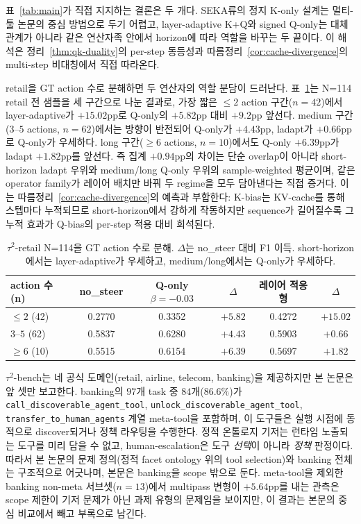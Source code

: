 표~\ref{tab:main}가 직접 지지하는 결론은 두 개다. SEKA류의 정지 K-only 설계는 멀티-툴 논문의 중심 방법으로 두기 어렵고, layer-adaptive K+Q와 signed Q-only는 대체 관계가 아니라 같은 연산자족 안에서 horizon에 따라 역할을 바꾸는 두 끝이다. 이 해석은 정리~\ref{thm:qk-duality}의 per-step 동등성과 따름정리~\ref{cor:cache-divergence}의 multi-step 비대칭에서 직접 따라온다.

retail을 GT action 수로 분해하면 두 연산자의 역할 분담이 드러난다. 표~\ref{tab:retail-action-count}는 N=114 retail 전 샘플을 세 구간으로 나눈 결과로, 가장 짧은 $\le 2$ action 구간($n=42$)에서 layer-adaptive가 $+15.02$pp로 Q-only의 $+5.82$pp 대비 $+9.2$pp 앞선다. medium 구간($3$--$5$ actions, $n=62$)에서는 방향이 반전되어 Q-only가 $+4.43$pp, ladapt가 $+0.66$pp로 Q-only가 우세하다. long 구간($\ge 6$ actions, $n=10$)에서도 Q-only $+6.39$pp가 ladapt $+1.82$pp를 앞선다. 즉 집계 $+0.94$pp의 차이는 단순 overlap이 아니라 short-horizon ladapt 우위와 medium/long Q-only 우위의 sample-weighted 평균이며, 같은 operator family가 레이어 배치만 바꿔 두 regime을 모두 담아낸다는 직접 증거다. 이는 따름정리~\ref{cor:cache-divergence}의 예측과 부합한다: K-bias는 KV-cache를 통해 스텝마다 누적되므로 short-horizon에서 강하게 작동하지만 sequence가 길어질수록 그 누적 효과가 Q-bias의 per-step 적용 대비 희석된다.

\begin{table}[t]
\centering
\caption{$\tau^2$-retail N=114을 GT action 수로 분해. $\Delta$는 no\_steer 대비 F1 이득. short-horizon에서는 layer-adaptive가 우세하고, medium/long에서는 Q-only가 우세하다.}
\label{tab:retail-action-count}
\small
\begin{tabularx}{\linewidth}{@{}lccccc@{}}
\toprule
action 수 (n) & no\_steer & Q-only $\beta{=}{-}0.03$ & $\Delta$ & 레이어 적응형 & $\Delta$ \\
\midrule
$\le 2$ (42) & 0.2770 & 0.3352 & $+5.82$ & 0.4272 & $+15.02$ \\
$3$--$5$ (62) & 0.5837 & 0.6280 & $+4.43$ & 0.5903 & $+0.66$ \\
$\ge 6$ (10) & 0.5515 & 0.6154 & $+6.39$ & 0.5697 & $+1.82$ \\
\bottomrule
\end{tabularx}
\end{table}

$\tau^2$-bench는 네 공식 도메인(retail, airline, telecom, banking)을 제공하지만 본 논문은 앞 셋만 보고한다. banking의 $97$개 task 중 $84$개($86.6\%$)가 \texttt{call\_discoverable\_agent\_tool}, \texttt{unlock\_discoverable\_agent\_tool}, \texttt{transfer\_to\_human\_agents} 계열 meta-tool을 포함하며, 이 도구들은 실행 시점에 동적으로 discover되거나 정책 라우팅을 수행한다. 정적 온톨로지 기저는 런타임 노출되는 도구를 미리 담을 수 없고, human-escalation은 도구 \emph{선택}이 아니라 \emph{정책} 판정이다. 따라서 본 논문의 문제 정의(정적 facet ontology 위의 tool selection)와 banking 전체는 구조적으로 어긋나며, 본문은 banking을 scope 밖으로 둔다. meta-tool을 제외한 banking non-meta 서브셋($n{=}13$)에서 multipass 변형이 $+5.64$pp를 내는 관측은 scope 제한이 기저 문제가 아닌 과제 유형의 문제임을 보이지만, 이 결과는 본문의 중심 비교에서 빼고 부록으로 남긴다.

